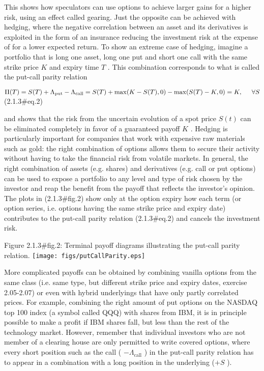 This shows how speculators can use options to achieve larger gains for a higher risk, using an effect called gearing. Just the opposite can be achieved with hedging, where the negative correlation between an asset and its derivatives is exploited in the form of an insurance reducing the investment risk at the expense of for a lower expected return. To show an extreme case of hedging, imagine a portfolio that is long one asset, long one put and short one call with the same strike price $ K$ and expiry time $ T$ . This combination corresponds to what is called the put-call parity relation

 $\displaystyle \Pi(T) = S(T)+\Lambda_\mathrm{put}-\Lambda_\mathrm{call} = S(T) + \mathrm{max}(K-S(T),0) -\mathrm{max}(S(T)-K,0) = K, \hspace{5mm}\forall S$	 (2.1.3#eq.2)

and shows that the risk from the uncertain evolution of a spot price  $ S(t)$ can be eliminated completely in favor of a guaranteed payoff $ K$ . Hedging is particularly important for companies that work with expensive raw materials such as gold: the right combination of options allows them to secure their activity without having to take the financial risk from volatile markets.
In general, the right combination of assets (e.g. shares) and derivatives (e.g. call or put options) can be used to expose a portfolio to any level and type of risk chosen by the investor and reap the benefit from the payoff that reflects the investor's opinion. The plots in (2.1.3#fig.2) show only at the option expiry how each term (or option series, i.e. options having the same strike price and expiry date) contributes to the put-call parity relation (2.1.3#eq.2) and cancels the investment risk.

Figure 2.1.3#fig.2: Terminal payoff diagrams illustrating the put-call parity relation.
\texttt{[image: figs/putCallParity.eps]}

More complicated payoffs can be obtained by combining vanilla options from the same class (i.e. same type, but different strike price and expiry dates, exercise 2.05-2.07) or even with hybrid underlyings that have only partly correlated prices. For example, combining the right amount of put options on the NASDAQ top 100 index (a symbol called QQQ) with shares from IBM, it is in principle possible to make a profit if IBM shares fall, but less than the rest of the technology market. However, remember that individual investors who are not member of a clearing house are only permitted to write covered options, where every short position such as the call ( $ -\Lambda_\mathrm{call}$ ) in the put-call parity relation has to appear in a combination with a long position in the underlying ($ +S$ ).

